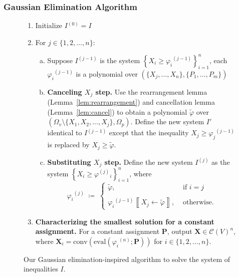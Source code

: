 \documentclass[10pt]{amsart}
\theoremstyle{plain}
\theoremstyle{definition}
\providecommand{\cC}[0]{\ensuremath{\mathcal C}\xspace}
\providecommand{\bP}[0]{\ensuremath{\mathbf P}\xspace}
\providecommand{\bX}[0]{\ensuremath{\mathbf X}\xspace}
\let\geq\geqslant
\providecommand{\defeq}[0]{\ensuremath{\;\coloneqq\;}\xspace}
\providecommand{\p}[1]{\ensuremath{^{\left(#1\right)}}\xspace}
\providecommand{\conv}[1]{\ensuremath{\mathrm{conv}{\left({#1}\right)}\xspace}}
\providecommand{\convset}[0]{\ensuremath{\cC}\xspace}
\providecommand{\evalmap}[0]{\ensuremath{\mathrm{eval}}\xspace}
\begin{document}
\subsubsection{Gaussian Elimination Algorithm}
\begin{figure}[htp]
    \centering
    \noindent\begin{boxedminipage}{\linewidth}
    \begin{enumerate}[1.] 
        \item Initialize $I\p 0= I$ 
        \item For $j\in \{1,2,\dotsc,n\}$: 
        \begin{enumerate}[(a)] 
            \item Suppose $I\p{j-1}$ is the system $ \left\{ X_i \geq \varphi_i\p{j-1}\right\}_{i=1}^n$, each $\varphi_i\p{j-1}$ is a polynomial over $(\{X_j, \dotsc, X_n\}, \{P_1, \dotsc, P_m\})$
            \item {\bfseries Canceling $X_j$ step.} 
                Use the rearrangement lemma (Lemma~\ref{lem:rearrangement}) and cancellation lemma (Lemma~\ref{lem:cancel}) to obtain a polynomial $\widetilde\varphi$ over $(\Omega_v\setminus\{X_1,X_2,\dotsc,X_j\}, \Omega_p)$. 
                Define the new system $I'$ identical to $I\p{j-1}$ except that the inequality $X_j\geq \varphi_j\p{j-1}$ is replaced by $X_j\geq \widetilde\varphi$. 
            \item {\bfseries Substituting $X_j$ step.} 
                Define the new system $I\p j$ as the system $\left\{ X_i \geq \varphi\p j_i\right\}_{i=1}^n$, where
                    $$\varphi_i\p j \defeq \begin{cases}
                        \widetilde\varphi, &\text{ if } i=j\\ 
                        \\ %
                        \varphi_i\p{j-1}\left\llbracket X_j\gets \widetilde\varphi\right\rrbracket,&\text{ otherwise.}
                    \end{cases}$$
        \end{enumerate}
        \item {\bfseries Characterizing the smallest solution for a constant assignment.} 
            For a constant assignment $\bP$, output $\bX\in\convset(V)^n$, where $\bX_i=\conv{ \evalmap\left(\varphi_i\p n; \bP\right) }$ for $i\in\{1,2,\dotsc,n\}$. 
    \end{enumerate}
    \end{boxedminipage}
    \caption{Our Gaussian elimination-inspired algorithm to solve the system of inequalities $I$.}
    \label{fig:gaussian-elim}
\end{figure}
\end{document}
